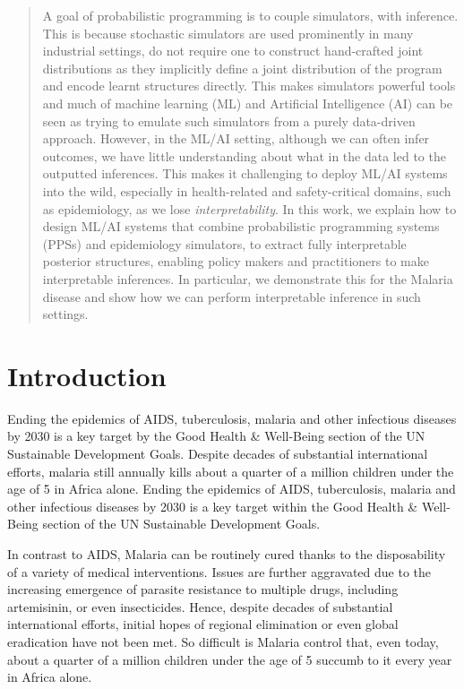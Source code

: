 \documentclass{article}
\begin{document}
\printAffiliationsAndNotice{\icmlEqualContribution} %

\begin{abstract}

A goal of probabilistic programming is to couple simulators, with inference. This is 
because stochastic simulators are used prominently in many industrial settings,
do not require one to construct hand-crafted joint distributions as they implicitly 
define a joint distribution of the program and encode learnt structures 
directly. This makes simulators powerful tools and much of machine learning (ML) and 
Artificial Intelligence (AI)
can be seen as trying to emulate such simulators from a purely data-driven approach.
However, in the 
ML/AI setting, although we can often infer outcomes, we have little understanding about what 
in the data led to the outputted inferences. 
This makes it challenging to deploy ML/AI systems into the wild, especially in health-related and safety-critical domains, such
as epidemiology, as we lose \emph{interpretability}. 
In this work, we explain how to design ML/AI systems that combine
probabilistic programming systems (PPSs) and epidemiology simulators, to extract
fully interpretable posterior structures, enabling policy makers 
and practitioners to make interpretable inferences. 
In particular, we demonstrate this for the Malaria disease and show how we can 
perform interpretable inference in such settings.
\end{abstract}

\section{Introduction}

Ending the epidemics of AIDS, tuberculosis, malaria and other infectious diseases by 2030 is a key target by the Good Health \& Well-Being section of the UN Sustainable Development Goals. 
Despite decades of substantial international efforts, malaria still annually kills about a quarter of a million children under the age of 5 in Africa alone.
Ending the epidemics of AIDS, tuberculosis, malaria and other infectious diseases by 2030 is a key target within the Good Health \& Well-Being section of the UN Sustainable Development Goals\cite{}. 

In contrast to AIDS, Malaria can be routinely cured thanks to the disposability of a variety of medical interventions. 
Issues are further aggravated due to the increasing emergence of parasite resistance to multiple drugs, including artemisinin, or even insecticides. 
Hence, despite decades of substantial international efforts, initial hopes of regional elimination or even global eradication have not been met.
 So difficult is Malaria control that, even today, about a quarter of a million children under the age of 5 succumb to it every year in Africa alone. 
\end{document}
